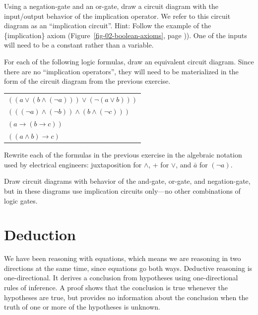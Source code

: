 \begin{ExerciseList}
\Exercise Using a negation-gate and an or-gate, draw a circuit diagram with the input/output behavior of the implication operator.
We refer to this circuit diagram as an ``implication circuit''.
Hint: Follow the example of the \{implication\} axiom
(Figure~\ref{fig-02-boolean-axioms}, page \pageref{fig-02-boolean-axioms})).
One of the inputs will need to be a constant rather than a variable.

\Exercise For each of the following logic formulas, draw an equivalent circuit diagram.
Since there are no ``implication operators'', they will need to be materialized
in the form of the circuit diagram from the previous exercise.
\begin{center}
\begin{tabular}{l}
$((a \vee (b \wedge (\neg a))) \vee (\neg (a \vee b)))$ \\
$(((\neg a) \wedge (\neg b)) \wedge (b \wedge (\neg c)))$ \\
$(a \rightarrow (b \rightarrow c))$ \\
$((a \wedge b) \rightarrow c)$ \\
\end{tabular}
\end{center}

\Exercise Rewrite each of the formulas in the previous exercise
in the algebraic notation used by electrical engineers:
juxtaposition for $\wedge$, + for $\vee$, and $\bar{a}$ for $(\neg a)$.

\Exercise Draw circuit diagrams with behavior of the and-gate, or-gate, and negation-gate,
but in these diagrams use implication circuits only---no other combinations of logic gates.
\end{ExerciseList}


\section{Deduction}

We have been reasoning with equations, which means we are reasoning in two directions
at the same time, since equations go both ways. Deductive reasoning is one-directional.
It derives a conclusion from hypotheses using one-directional rules of inference.
A proof shows that the conclusion is true whenever the hypotheses are true, but provides
no information about the conclusion when the truth of one or more of the hypotheses is
unknown.

